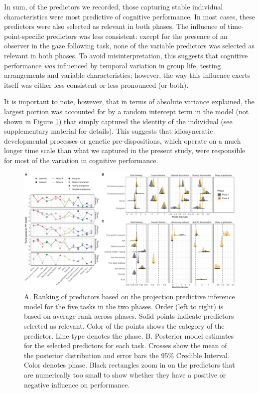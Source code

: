 \documentclass[
  man,floatsintext]{apa6}
\begin{document}
In sum, of the predictors we recorded, those capturing stable individual characteristics were most predictive of cognitive performance. In most cases, these predictors were also selected as relevant in both phases. The influence of time-point-specific predictors was less consistent: except for the presence of an observer in the gaze following task, none of the variable predictors was selected as relevant in both phases. To avoid misinterpretation, this suggests that cognitive performance \emph{was} influenced by temporal variation in group life, testing arrangements and variable characteristics; however, the way this influence exerts itself was either less consistent or less pronounced (or both).

It is important to note, however, that in terms of absolute variance explained, the largest portion was accounted for by a random intercept term in the model (not shown in Figure \ref{fig:ppiplot}) that simply captured the identity of the individual (see supplementary material for details). This suggests that idiosyncratic developmental processes or genetic pre-dispositions, which operate on a much longer time scale than what we captured in the present study, were responsible for most of the variation in cognitive performance.

\begin{figure}

{\centering \includegraphics[width=1\linewidth]{./figures/ppi3_i7} 

}

\caption{A. Ranking of predictors based on the projection predictive inference model for the five tasks in the two phases. Order (left to right) is based on average rank across phases. Solid points indicate predictors selected as relevant. Color of the points shows the category of the predictor. Line type denotes the phase. B. Posterior model estimates for the selected predictors for each task. Crosses show the mean of the posterior distribution and error bars the 95\% Credible Interval. Color denotes phase. Black rectangles zoom in on the predictors that are numerically too small to show whether they have a positive or negative influence on performance.}\label{fig:ppiplot}
\end{figure}
\end{document}
